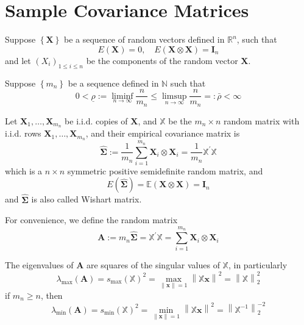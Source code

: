 \chapter{Sample Covariance Matrices}

Suppose $\left\{\mathbf{X}\right\}$ be a sequence of random vectors defined in $\mathbb{R}^{n}$, such that
\begin{equation*}
    E\left(\mathbf{X}\right)=0,\quad E\left(\mathbf{X}\otimes\mathbf{X}\right)=\mathbf{I}_{n}
\end{equation*}
and let $\left(X_{i}\right)_{1\leq i\leq n}$ be the components of the random vector $\mathbf{X}$.

Suppose $\left\{m_{n}\right\}$ be a sequence defined in $\mathbb{N}$ such that
\begin{equation*}
    0<\underline{\rho}:=\liminf_{n\rightarrow\infty}\frac{n}{m_{n}}\leq\limsup_{n\rightarrow\infty}\frac{n}{m_{n}}=:\bar{\rho}<\infty
\end{equation*}

Let $\mathbf{X}_{1},\ldots,\mathbf{X}_{m_{n}}$ be i.i.d. copies of $\mathbf{X}$, and $\mathbb{X}$ be the $m_{n}\times n$ random matrix with i.i.d. rows $\mathbf{X}_{1},\ldots,\mathbf{X}_{m_{n}}$, and their empirical covariance matrix is
\begin{equation*}
    \widehat{\boldsymbol{\Sigma}}:=\frac{1}{m_{n}}\sum_{i=1}^{m_{n}}\mathbf{X}_{i}\otimes \mathbf{X}_{i}=\frac{1}{m_{n}}\mathbb{X}^{\prime}\mathbb{X}
\end{equation*}
which is a $n\times n$ symmetric positive semidefinite random matrix, and
\begin{equation*}
    E\left(\widehat{\boldsymbol{\Sigma}}\right)=\mathbb{E}\left(\mathbf{X}\otimes\mathbf{X}\right)=\mathbf{I}_{n}
\end{equation*}
and $\widehat{\boldsymbol{\Sigma}}$ is also called Wishart matrix.

For convenience, we define the random matrix
\begin{equation*}
    \mathbf{A}:=m_{n}\widehat{\boldsymbol{\Sigma}}=\mathbb{X}^{\prime}\mathbb{X}=\sum_{i=1}^{m_{n}}\mathbf{X}_{i}\otimes\mathbf{X}_{i}
\end{equation*}

\begin{note}
    The eigenvalues of $\mathbf{A}$ are squares of the singular values of $\mathbb{X}$, in particularly
    \begin{equation*}
        \lambda_{\max}\left(\mathbf{A}\right)=s_{\max}\left(\mathbb{X}\right)^{2}=\max_{\|\mathbf{x}\|=1}\left\|\mathbb{X}\mathbf{x}\right\|^{2}=\left\|\mathbb{X}\right\|_{2}^{2}
    \end{equation*}
    if $m_{n}\geq n$, then
    \begin{equation*}
        \lambda_{\min}\left(\mathbf{A}\right)=s_{\min}\left(\mathbb{X}\right)^{2}=\min_{\|\mathbf{x}\|=1}\left\|\mathbb{X}\mathbf{x}\right\|^{2}=\left\|\mathbb{X}^{-1}\right\|_{2}^{-2}
    \end{equation*}
\end{note}

